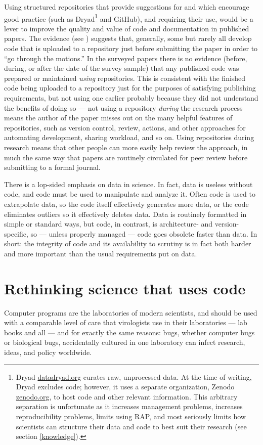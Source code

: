 \documentclass{comjnl}
\begin{document}
Using structured repositories that provide suggestions for and which encourage good practice (such as Dryad\footnote{Dryad \url{datadryad.org} curates raw, unprocessed data. At the time of writing, Dryad excludes code; however, it uses a separate organization, Zenodo \url{zenodo.org}, to host code and other relevant information. This arbitrary separation is unfortunate as it increases management problems, increases reproducibility problems, limits using RAP, and most seriously limits how scientists can structure their data and code to best suit their research (see section \ref{knowledge}).} and GitHub), and requiring their use, would be a lever to improve the quality and value of code and documentation in published papers. The evidence (see \supplement) suggests that, generally, some but rarely all develop code that is uploaded to a repository just before submitting the paper in order to ``go through the motions.'' In the surveyed papers there is no evidence (before, during, or after the date of the survey sample) that any published code was prepared or maintained \emph{using\/} repositories. This is consistent with the finished code being uploaded to a repository just for the purposes of satisfying publishing requirements, but not using one earlier probably because they did not understand the benefits of doing so --- not using a repository \emph{during\/} the research process means the author of the paper misses out on the many helpful features of repositories, such as version control, review, actions, and other approaches for automating development, sharing workload, and so on. Using repositories during research means that other people can more easily help review the approach, in much the same way that papers are routinely circulated for peer review before submitting to a formal journal.

There is a lop-sided emphasis on data in science. In fact, data is useless without code, and code must be used to manipulate and analyze it. Often code is used to extrapolate data, so the code itself effectively generates more data, or the code eliminates outliers so it effectively deletes data. Data is routinely formatted in simple or standard ways, but code, in contrast, is architecture- and version-specific, so --- unless properly managed --- code goes obsolete faster than data. In short: the integrity of code and its availability to scrutiny is in fact both harder and more important than the usual requirements put on data.

\section{Rethinking science that uses code}\label{summary}
Computer programs are the laboratories of modern scientists, and should be used with a comparable level of care that virologists use in their laboratories --- lab books and all \cite{notebooks} --- and for exactly the same reasons: bugs, whether computer bugs or biological bugs, accidentally cultured in one laboratory can infect research, ideas, and policy worldwide. 
\end{document}
